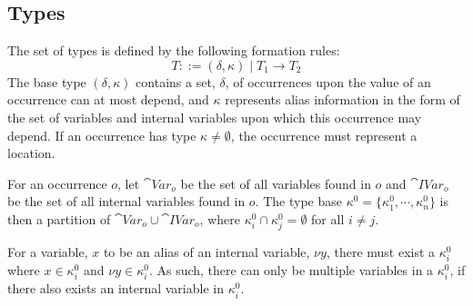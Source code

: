 \documentclass{llncs}
\begin{document}


\subsection{Types}\label{sec:types}

The set of types  is defined by the following formation rules:
%
\[ T ::=(\delta,\kappa)\mid T_1 \rightarrow T_2 \]
%
The base type $(\delta,\kappa)$ contains a set, $\delta$, of occurrences upon the value of an occurrence can at most depend,
and $\kappa$ represents alias information in the form of the set of variables and internal variables upon which this occurrence may depend.
If an occurrence has type $\kappa \neq \emptyset$,
the occurrence must represent a location.

\begin{definition}
	For an occurrence $o$, let $\cat{Var}_o$ be the set of all
        variables found in $o$ and $\cat{IVar}_o$ be the set of all
        internal variables found in $o$.
	The type base $\kappa^0=\{\kappa^0_1,\cdots,\kappa^0_n\}$ is
        then a partition of $\cat{Var}_o \cup \cat{IVar}_o$, where
        $\kappa_i^0\cap\kappa_j^0=\emptyset$ for all $i\neq j$. 
\end{definition}
For a variable, $x$ to be an alias of an internal variable, $\nu y$,
there must exist a $\kappa^0_i$ where $x \in \kappa^0_i$ and $\nu y
\in \kappa^0_i$. 
As such, there can only be multiple variables in a $\kappa^0_i$, if
there also exists an internal variable in $\kappa^0_i$. 

\end{document}
